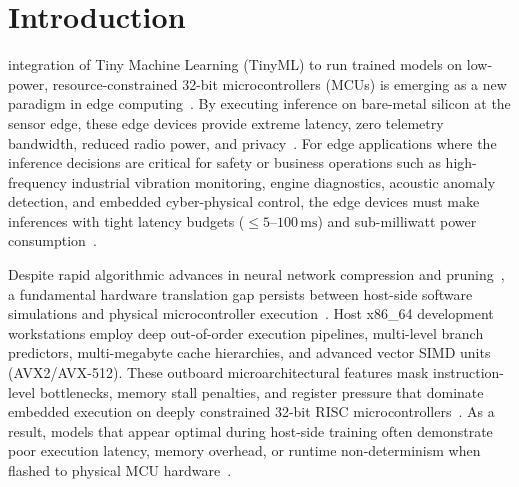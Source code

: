 \documentclass[journal,10pt]{IEEEtran}
\begin{document}
\maketitle
\IEEEdisplaynontitleabstractindextext

\section{Introduction}
 integration of Tiny Machine Learning (TinyML) to run trained models on low-power, resource-constrained 32-bit microcontrollers (MCUs) is emerging as a new paradigm in edge computing~\cite{warden2019tinyml,ray2022review,saha2022tinyml}. By executing inference on bare-metal silicon at the sensor edge, these edge devices provide extreme latency, zero telemetry bandwidth, reduced radio power, and privacy~\cite{banbury2021benchmarking,schizas2022tinyml}. For edge applications where the inference decisions are critical for safety or business operations such as high-frequency industrial vibration monitoring, engine diagnostics, acoustic anomaly detection, and embedded cyber-physical control, the edge devices must make inferences with tight latency budgets ($\le 5\text{--}100\,\text{ms}$) and sub-milliwatt power consumption~\cite{rusci2020workload,sanchez2020tinyml}.

Despite rapid algorithmic advances in neural network compression and pruning~\cite{sze2017efficient,han2016deep}, a fundamental hardware translation gap persists between host-side software simulations and physical microcontroller execution~\cite{david2021tensorflow,rusci2020workload}. Host x86\_64 development workstations employ deep out-of-order execution pipelines, multi-level branch predictors, multi-megabyte cache hierarchies, and advanced vector SIMD units (AVX2/AVX-512). These outboard microarchitectural features mask instruction-level bottlenecks, memory stall penalties, and register pressure that dominate embedded execution on deeply constrained 32-bit RISC microcontrollers~\cite{banbury2021benchmarking,lin2020mcunet}. As a result, models that appear optimal during host-side training often demonstrate poor execution latency, memory overhead, or runtime non-determinism when flashed to physical MCU hardware~\cite{blalock2020state}.
\end{document}
